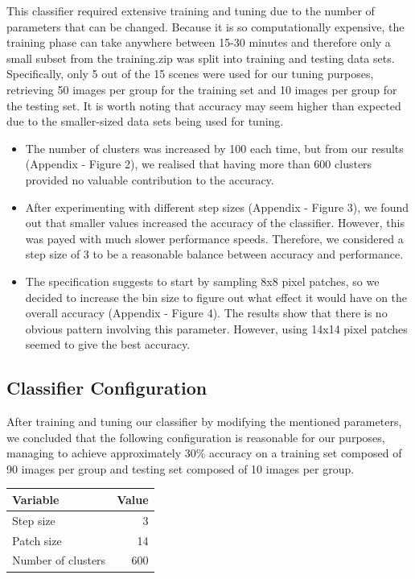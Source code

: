 \documentclass[a4paper]{article}
\begin{document}
This classifier required extensive training and tuning due to the number of parameters that can be changed. Because it is so computationally expensive, the training phase can take anywhere between 15-30 minutes and therefore only a small subset from the training.zip was split into training and testing data sets. Specifically, only 5 out of the 15 scenes were used for our tuning purposes, retrieving 50 images per group for the training set and 10 images per group for the testing set. It is worth noting that accuracy may seem higher than expected due to the smaller-sized data sets being used for tuning.\\

\begin{itemize}
\item The number of clusters was increased by 100 each time, but from our results (Appendix - Figure 2), we realised that having more than 600 clusters provided no valuable contribution to the accuracy.\\
\item After experimenting with different step sizes (Appendix - Figure 3), we found out that smaller values increased the accuracy of the classifier. However, this was payed with much slower performance speeds. Therefore, we considered a step size of 3 to be a reasonable balance between accuracy and performance.\\
\item The specification suggests to start by sampling 8x8 pixel patches, so we decided to increase the bin size to figure out what effect it would have on the overall accuracy (Appendix - Figure 4). The results show that there is no obvious pattern involving this parameter. However, using 14x14 pixel patches seemed to give the best accuracy.\\
\end{itemize}

\subsection{Classifier Configuration}
After training and tuning our classifier by modifying the mentioned parameters, we concluded that the following configuration is reasonable for our purposes, managing to achieve approximately 30\% accuracy on a training set composed of 90 images per group and testing set composed of 10 images per group.\\
\begin{center}
    \def\arraystretch{1.5}%
    \begin{tabular}{ | l | r |}
    \hline
    \textbf{Variable} & \textbf{Value} \\ \hline
    Step size & 3 \\ \hline
    Patch size & 14 \\ \hline
    Number of clusters & 600 \\ \hline
    \end{tabular}
\end{center}
\bigskip
\end{document}
